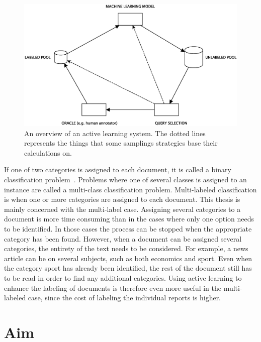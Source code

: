 \begin{figure}
    \centering
    \includegraphics[width=\textwidth]{figures/active-learning-model.eps}
    \caption{An overview of an active learning system. The dotted lines represents the things that some samplings strategies base their calculations on.}
    \label{fig:active-learning-model}
\end{figure}

If one of two categories is assigned to each document, it is called a binary classification problem~\cite{bishop2006pattern}.
Problems where one of several classes is assigned to an instance are called a multi-class classification problem.
Multi-labeled classification is when one or more categories are assigned to each document.
This thesis is mainly concerned with the multi-label case.
Assigning several categories to a document is more time consuming than in the cases where only one option needs to be identified.
In those cases the process can be stopped when the appropriate category has been found.
However, when a document can be assigned several categories, the entirety of the text needs to be considered.
For example, a news article can be on several subjects, such as both economics and sport.
Even when the category sport has already been identified, the rest of the document still has to be read in order to find any additional categories.
Using active learning to enhance the labeling of documents is therefore even more useful in the multi-labeled case, since the cost of labeling the individual reports is higher.

\section{Aim}
\label{sec:aim}

